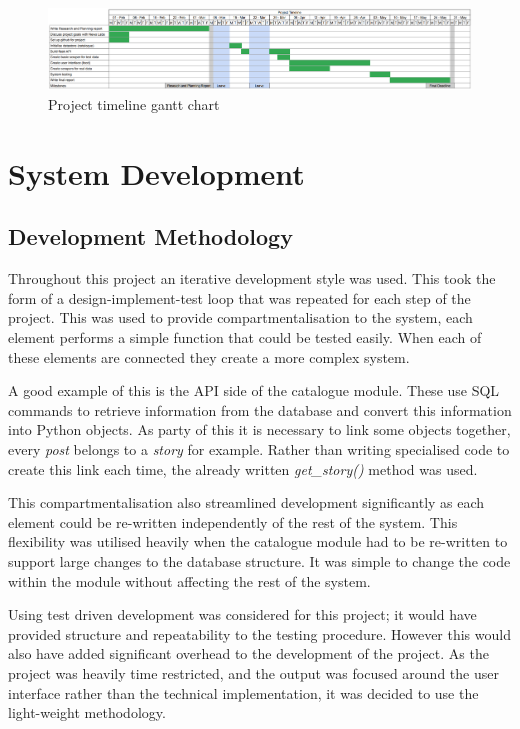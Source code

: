 \documentclass[12pt,titlepage]{article}
\begin{document}
  \clearpage

  \begin{figure}
    \includegraphics[width=\textheight]{../img/gantt.png}
    \caption{Project timeline gantt chart}
    \label{fig:gantt}
  \end{figure}

  \clearpage

\section{System Development}


  \subsection{Development Methodology}

  Throughout this project an iterative development style was used. This took the
  form of a design-implement-test loop that was repeated for each step of the
  project. This was used to provide compartmentalisation to the system, each
  element performs a simple function that could be tested easily. When each of
  these elements are connected they create a more complex system.

  A good example of this is the API side of the catalogue module. These use SQL
  commands to retrieve information from the database and convert this
  information into Python objects. As party of this it is necessary to link some
  objects together, every \textit{post} belongs to a \textit{story} for example.
  Rather than writing specialised code to create this link each time, the
  already written \textit{get\_story()} method was used.

  This compartmentalisation also streamlined development significantly as each
  element could be re-written independently of the rest of the system. This
  flexibility was utilised heavily when the catalogue module had to be
  re-written to support large changes to the database structure. It was simple
  to change the code within the module without affecting the rest of the system.

  Using test driven development was considered for this project; it would have
  provided structure and repeatability to the testing procedure. However this
  would also have added significant overhead to the development of the project.
  As the project was heavily time restricted, and the output was focused around
  the user interface rather than the technical implementation, it was decided to
  use the light-weight methodology.
\end{document}
